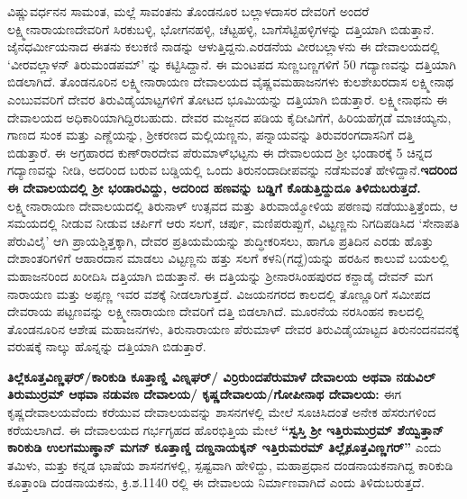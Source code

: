 ವಿಷ್ಣುವರ್ಧನನ ಸಾಮಂತ, ಮಲ್ಲೆ ಸಾವಂತನು ತೊಂಡನೂರ ಬಲ್ಲಾಳದಾಸರ ದೇವರಿಗೆ ಅಂದರೆ ಲಕ್ಷ್ಮೀನಾರಾಯಣದೇವರಿಗೆ ಸಿರಕುಬಳ್ಳಿ, ಭೋಗನಹಳ್ಳಿ, ಚೆಟ್ಟಹಳ್ಳಿ, ಬಾಗೆಸೆಟ್ಟಿಹಳ್ಳಿಗಳನ್ನು ದತ್ತಿಯಾಗಿ ಬಿಡುತ್ತಾನೆ. ಜೈನಧರ್ಮೀಯನಾದ ಈತನು ಕಲುಕಣಿ ನಾಡನ್ನು ಆಳುತ್ತಿದ್ದನು.ಎರಡನೆಯ ವೀರಬಲ್ಲಾಳನು ಈ ದೇವಾಲಯದಲ್ಲಿ ‘ವೀರವಲ್ಲಾಳನ್​ ತಿರುಮಂಡಪಮ್’ ನ್ನು ಕಟ್ಟಿಸಿದ್ದಾನೆ. ಈ ಮಂಟಪದ ಸುಣ್ಣಬಣ್ಣಗಳಿಗೆ 50 ಗದ್ಯಾಣವನ್ನು ದತ್ತಿಯಾಗಿ ಬಿಡಲಾಗಿದೆ. ತೊಂಡನೂರಿನ ಲಕ್ಷ್ಮೀನಾರಾಯಣ ದೇವಾಲಯದ ವೈಷ್ಣವಮಹಾಜನಗಳು ಕುಲಶೇಖರದಾಸ ಲಕ್ಷ್ಮೀನಾಥ ಎಂಬುವವರಿಗೆ ದೇವರ ತಿರುವಿಡೈಯಾಟ್ಟಗಳಿಗೆ ತೋಟದ ಭೂಮಿಯನ್ನು ದತ್ತಿಯಾಗಿ ಬಿಡುತ್ತಾರೆ. ಲಕ್ಷ್ಮೀನಾಥನು ಈ ದೇವಾಲಯದ ಅಧಿಕಾರಿಯಾಗಿದ್ದಿರಬಹುದು. ದೇವರ ಮಜ್ಜನದ ಪಡಿಯ ಕೈದೀವಿಗೆಗೆ, ಹಿರಿಯಹೆಗ್ಗಡೆ ಮಾಚಯ್ಯನು, ಗಾಣದ ಸುಂಕ ಮತ್ತು ಎಣ್ಣೆಯನ್ನು, ಶ‍್ರೀಕರಣದ ಮಲ್ಲಿಯಣ್ಣನು, ಪನ್ನಾಯವನ್ನು ತಿರುವರಂಗದಾಸನಿಗೆ ದತ್ತಿ ಬಿಡುತ್ತಾರೆ. ಈ ಅಗ್ರಹಾರದ ಕುಣ್​ರಾರದೇವ ಪೆರುಮಾಳ್​ಭಟ್ಟನು ಈ ದೇವಾಲಯದ ಶ‍್ರೀ ಭಂಡಾರಕ್ಕೆ 5 ಚಿನ್ನದ ಗದ್ಯಾಣವನ್ನು ನೀಡಿ, ಅದರಿಂದ ಬರುವ ಬಡ್ಡಿಯಲ್ಲಿ ಒಂದು ತಿರುನಂದಾದೀಪವನ್ನು ನಡೆಸುವಂತೆ ಹೇಳಿದ್ದಾನೆ.\textbf{ಇದರಿಂದ ಈ ದೇವಾಲಯದಲ್ಲಿ ಶ‍್ರೀ ಭಂಡಾರವಿದ್ದು, ಅದರಿಂದ ಹಣವನ್ನು ಬಡ್ಡಿಗೆ ಕೊಡುತ್ತಿದ್ದುದೂ ತಿಳಿದುಬರುತ್ತದೆ.} ಲಕ್ಷ್ಮೀನಾರಾಯಣ ದೇವಾಲಯದಲ್ಲಿ ತಿರುನಾಳ್​ ಉತ್ಸವದ ಮತ್ತು ತಿರುವಾಯ್ಮೋಳಿಯ ಪಠಣವು ನಡೆಯುತ್ತಿತ್ತೆಂದು, ಆ ಸಮಯದಲ್ಲಿ ನೀಡುವ ನೀಡುವ ಚರ್ಪಿಗೆ ಆರು ಸಲಗೆ, ಚರ್ಪು, ಮಣಿಪರುಪ್ಪುಗೆ, ವಿಟ್ಟಣ್ಣನು ನಿಗದಿಪಡಿಸಿದ ‘ಸೇನಾಪತಿ ಪೆರುವಿಲೈ’ ಆಗಿ ಪ್ರಾಯಶ್ಚಿತ್ತಕ್ಕಾಗಿ, ದೇವರ ಪ್ರತಿಯಮೆಯನ್ನು ಶುದ್ಧೀಕರಿಸಲು, ಹಾಗೂ ಪ್ರತಿದಿನ ಎರಡು ಹೊತ್ತು ದೇಶಾಂತರಿಗಳಿಗೆ ಆಹಾರದಾನ ಮಾಡಲು ವಿಟ್ಟಣ್ಣನು ಹತ್ತು ಸಲಗೆ ಕಳನಿ(ಗದ್ದೆ)ಯನ್ನು ಹರಹಿನ ಕಾಲುವೆ ಬಯಲಲ್ಲಿ ಮಹಾಜನರಿಂದ ಖರೀದಿಸಿ ದತ್ತಿಯಾಗಿ ಬಿಡುತ್ತಾನೆ. ಈ ದತ್ತಿಯನ್ನು ಶ‍್ರೀನಾರಸಿಂಹಪುರದ ಕನ್ದಾಡೈ ದೇವನ್​ ಮಗ ನಾರಾಯಣ ಮತ್ತು ಅಪ್ಪಣ್ಣ ಇವರ ವಶಕ್ಕೆ ನೀಡಲಾಗುತ್ತದೆ. ವಿಜಯನಗರದ ಕಾಲದಲ್ಲಿ ತೊಣ್ಣೂರಿಗೆ ಸಮೀಪದ ದೇವರಾಯ ಪಟ್ಟಣವನ್ನು ಲಕ್ಷ್ಮೀನಾರಾಯಣ ದೇವರಿಗೆ ದತ್ತಿ ಬಿಡಲಾಗಿದೆ. ಮೂರನೆಯ ನರಸಿಂಹನ ಕಾಲದಲ್ಲಿ ತೊಂಡನೂರಿನ ಆಶೇಷ ಮಹಾಜನಗಳು, ತಿರುನಾರಾಯಣ ಪೆರುಮಾಳ್​ ದೇವರ ತಿರುವಿಡೈಯಾಟ್ಟದ ತಿರುನಂದನವನಕ್ಕೆ ವರುಷಕ್ಕೆ ನಾಲ್ಕು ಹೊನ್ನನ್ನು ದತ್ತಿಯಾಗಿ ಬಿಡುತ್ತಾರೆ.

\textbf{ತಿಲ್ಲೆಕೂತ್ತವಿಣ್ಣಘರ್​/ಕಾರಿಕುಡಿ ಕೂತ್ತಾಣ್ಡಿ ವಿಣ್ನಘರ್​/ ವಿರ್ರಿರುಂದಪೆರುಮಾಳೆ ದೇವಾಲಯ ಅಥವಾ ನಡುವಿಲ್​ ತಿರುಮುರ್ರಮ್ ಆಥವಾ ನಡುವಣ ದೇವಾಲಯ/ ಕೃಷ್ಣದೇವಾಲಯ/ಗೋಪೀನಾಥ ದೇವಾಲಯ:} ಈಗ ಕೃಷ್ಣದೇವಾಲಯವೆಂದು ಕರೆಯುವ ದೇವಾಲಯವನ್ನು ಶಾಸನಗಳಲ್ಲಿ ಮೇಲೆ ಸೂಚಿಸಿದಂತೆ ಅನೇಕ ಹೆಸರುಗಳಿಂದ ಕರೆಯಲಾಗಿದೆ. ಈ ದೇವಾಲಯದ ಗರ್ಭಗೃಹದ ಹೊರಭಿತ್ತಿಯ ಮೇಲೆ \textbf{“ಸ್ವಸ್ತಿ ಶ‍್ರೀ ಇತ್ತಿರುಮುರ್ರಮ್ ಶೆಯ್ವಿತ್ತಾನ್​ ಕಾರಿಕುಡಿ ಉಲಗಮುಣ್ಢಾನ್​ ಮಗನ್​ ಕೂತ್ತಾಣ್ಡಿ ದಣ್ಡನಾಯಕ್ಕನ್​ ಇತ್ತಿರುಮರಮ್ ತಿಲ್ಲೈಕೂತ್ತವಿಣ್ಣಗರ್​”} ಎಂದು ತಮಿಳು, ಮತ್ತು ಕನ್ನಡ ಭಾಷೆಯ ಶಾಸನಗಳಲ್ಲಿ, ಸ್ಪಷ್ಟವಾಗಿ ಹೇಳಿದ್ದು, ಮಹಾಪ್ರಧಾನ ದಂಡನಾಯಕನಾಗಿದ್ದ ಕಾರಿಕುಡಿ ಕೂತ್ತಾಂಡಿ ದಂಡನಾಯಕನು, ಕ್ರಿ.ಶ.1140 ರಲ್ಲಿ ಈ ದೇವಾಲಯ ನಿರ್ಮಾಣವಾಗಿದೆ ಎಂದು ತಿಳಿದುಬರುತ್ತದೆ.

